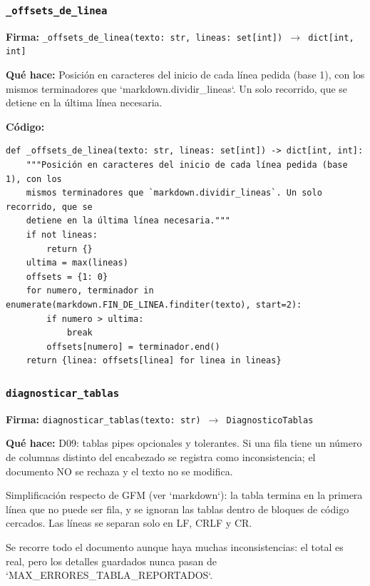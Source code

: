 \documentclass[11pt,a4paper]{article}
\begin{document}
\subsubsection*{\texttt{\_offsets\_de\_linea}}
\textbf{Firma:} \texttt{\_offsets\_de\_linea(texto: str, lineas: set[int]) $\rightarrow$ dict[int, int]}

\textbf{Qué hace:} Posición en caracteres del inicio de cada línea pedida (base 1), con los
mismos terminadores que `markdown.dividir\_lineas`. Un solo recorrido, que se
detiene en la última línea necesaria.

\textbf{Código:}
\begin{lstlisting}
def _offsets_de_linea(texto: str, lineas: set[int]) -> dict[int, int]:
    """Posición en caracteres del inicio de cada línea pedida (base 1), con los
    mismos terminadores que `markdown.dividir_lineas`. Un solo recorrido, que se
    detiene en la última línea necesaria."""
    if not lineas:
        return {}
    ultima = max(lineas)
    offsets = {1: 0}
    for numero, terminador in enumerate(markdown.FIN_DE_LINEA.finditer(texto), start=2):
        if numero > ultima:
            break
        offsets[numero] = terminador.end()
    return {linea: offsets[linea] for linea in lineas}
\end{lstlisting}

\subsubsection*{\texttt{diagnosticar\_tablas}}
\textbf{Firma:} \texttt{diagnosticar\_tablas(texto: str) $\rightarrow$ DiagnosticoTablas}

\textbf{Qué hace:} D09: tablas pipes opcionales y tolerantes. Si una fila tiene un número de
columnas distinto del encabezado se registra como inconsistencia; el
documento NO se rechaza y el texto no se modifica.

Simplificación respecto de GFM (ver `markdown`): la tabla termina en la
primera línea que no puede ser fila, y se ignoran las tablas dentro de
bloques de código cercados. Las líneas se separan solo en LF, CRLF y CR.

Se recorre todo el documento aunque haya muchas inconsistencias: el total es
real, pero los detalles guardados nunca pasan de `MAX\_ERRORES\_TABLA\_REPORTADOS`.
\end{document}
